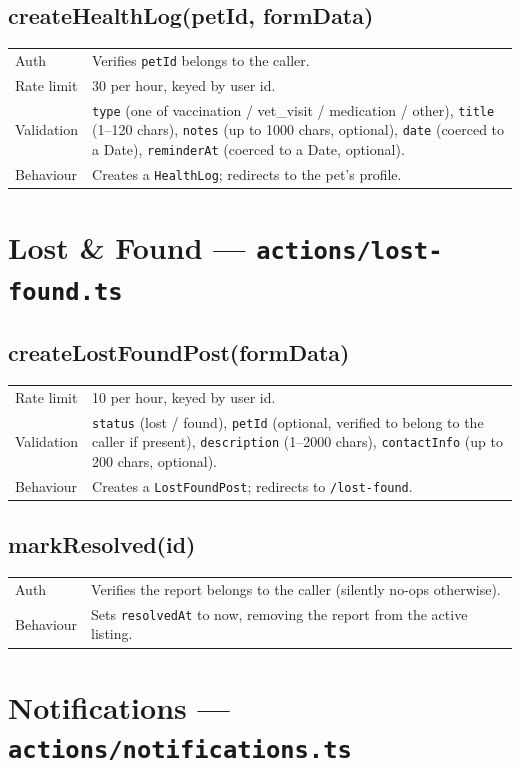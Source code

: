 \documentclass[11pt,a4paper]{article}
\makeatletter
\newcommand{\actiontable}[1]{%
  \begin{tabular}{@{}p{2.6cm}p{10.9cm}@{}}
  #1
  \end{tabular}
}
\makeatother
\begin{document}
\subsection{createHealthLog(petId, formData)}
\actiontable{
Auth & Verifies \texttt{petId} belongs to the caller. \\
Rate limit & 30 per hour, keyed by user id. \\
Validation & \texttt{type} (one of vaccination / vet\_visit / medication / other),
  \texttt{title} (1--120 chars), \texttt{notes} (up to 1000 chars, optional),
  \texttt{date} (coerced to a Date), \texttt{reminderAt} (coerced to a Date,
  optional). \\
Behaviour & Creates a \texttt{HealthLog}; redirects to the pet's profile. \\
}

\section{Lost \& Found --- \texttt{actions/lost-found.ts}}

\subsection{createLostFoundPost(formData)}
\actiontable{
Rate limit & 10 per hour, keyed by user id. \\
Validation & \texttt{status} (lost / found), \texttt{petId} (optional, verified to
  belong to the caller if present), \texttt{description} (1--2000 chars),
  \texttt{contactInfo} (up to 200 chars, optional). \\
Behaviour & Creates a \texttt{LostFoundPost}; redirects to \texttt{/lost-found}. \\
}

\subsection{markResolved(id)}
\actiontable{
Auth & Verifies the report belongs to the caller (silently no-ops otherwise). \\
Behaviour & Sets \texttt{resolvedAt} to now, removing the report from the active
  listing. \\
}

\section{Notifications --- \texttt{actions/notifications.ts}}
\end{document}
